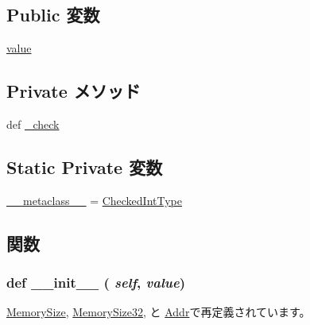 \subsection*{Public 変数}
\begin{DoxyCompactItemize}
\item 
\hyperlink{classm5_1_1params_1_1CheckedInt_afcc7a4b78ecd8fa7e713f8cfa0f51017}{value}
\end{DoxyCompactItemize}
\subsection*{Private メソッド}
\begin{DoxyCompactItemize}
\item 
def \hyperlink{classm5_1_1params_1_1CheckedInt_a5c5703e7ec69bc87b19ba3165760ea36}{\_\-check}
\end{DoxyCompactItemize}
\subsection*{Static Private 変数}
\begin{DoxyCompactItemize}
\item 
\hyperlink{classm5_1_1params_1_1CheckedInt_adfc4d1824f4ecdcbb04ceafc5bbc933e}{\_\-\_\-metaclass\_\-\_\-} = \hyperlink{classm5_1_1params_1_1CheckedIntType}{CheckedIntType}
\end{DoxyCompactItemize}


\subsection{関数}
\hypertarget{classm5_1_1params_1_1CheckedInt_ac775ee34451fdfa742b318538164070e}{
\subsubsection[{\_\-\_\-init\_\-\_\-}]{\setlength{\rightskip}{0pt plus 5cm}def \_\-\_\-init\_\-\_\- ( {\em self}, \/   {\em value})}}
\label{classm5_1_1params_1_1CheckedInt_ac775ee34451fdfa742b318538164070e}


\hyperlink{classm5_1_1params_1_1MemorySize_ac775ee34451fdfa742b318538164070e}{MemorySize}, \hyperlink{classm5_1_1params_1_1MemorySize32_ac775ee34451fdfa742b318538164070e}{MemorySize32}, と \hyperlink{classm5_1_1params_1_1Addr_ac775ee34451fdfa742b318538164070e}{Addr}で再定義されています。


